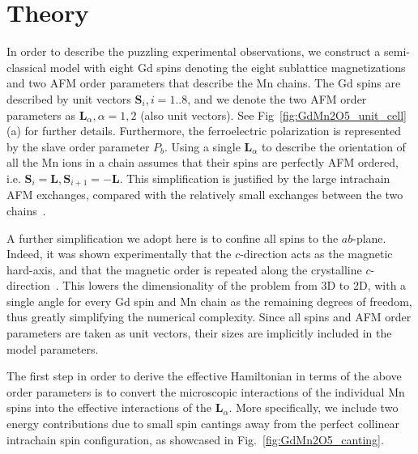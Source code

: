 \section{Theory \label{sec:GdMn2O5_Theory}}
In order to describe the puzzling experimental observations, we construct a semi-classical model with eight Gd spins denoting the eight sublattice magnetizations and two \gls{AFM} order parameters that describe the Mn chains.
The Gd spins are described by unit vectors $\bm{S}_i, i=1..8$, and we denote the two \gls{AFM} order parameters as $\bm{L}_\alpha, \alpha=1,2$ (also unit vectors). See Fig~\ref{fig:GdMn2O5_unit_cell}(a) for further details.
Furthermore, the ferroelectric polarization is represented by the slave order parameter $P_b$.
Using a single $\bm{L}_\alpha$ to describe the orientation of all the Mn ions in a chain assumes that their spins are perfectly \gls{AFM} ordered, i.e. $\bm{S}_i = \bm L, \bm{S}_{i+1} = - \bm{L}$.
This simplification is justified by the large intrachain \gls{AFM} exchanges, compared with the relatively small exchanges between the two chains~\cite{Souza11}.

A further simplification we adopt here is to confine all spins to the $ab$-plane.
Indeed, it was shown experimentally that the $c$-direction acts as the magnetic hard-axis, and that the magnetic order is repeated along the crystalline $c$-direction~\cite{Lee13}.
This lowers the dimensionality of the problem from 3D to 2D, with a single angle for every Gd spin and Mn chain as the remaining degrees of freedom, thus greatly simplifying the numerical complexity.
Since all spins and \gls{AFM} order parameters are taken as unit vectors, their sizes are implicitly included in the model parameters.

The first step in order to derive the effective Hamiltonian in terms of the above order parameters is to convert the microscopic interactions of the individual Mn spins into the effective interactions of the $\bm{L}_\alpha$.
More specifically, we include two energy contributions due to small spin cantings away from the perfect collinear intrachain spin configuration, as showcased in Fig.~\ref{fig:GdMn2O5_canting}.

\begin{figure*}[h]
    \centering
	\caption{{\bf Energy contributions due to spin canting.} a) The Zeeman contribution due to the weak ferromagnetic moment along the field (H, red arrow), as a result of the spin canting. b) The contribution due to Heisenberg exchange when previously parallel Mn spins are canted towards a more \gls{AFM} alignment. This is a direct result of the geometric frustration. The collinear configuration is denoted by the black arrows, with the dashed teal arrows showing the orientation due to the slight canting by the angle $\delta \theta$. \label{fig:GdMn2O5_canting}}
\end{figure*}

